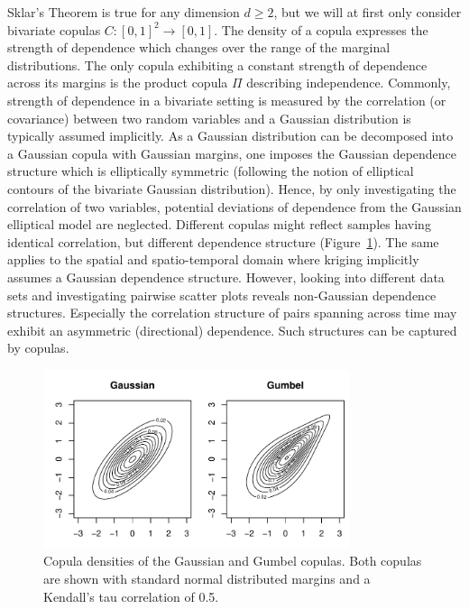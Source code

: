 \documentclass[article,nojss]{jss}
\begin{document}
Sklar's Theorem is true for any dimension $d \geq 2$, but we will at first only consider bivariate copulas $C:[0,1]^2\rightarrow[0,1]$. The density of a copula expresses the strength of dependence which changes over the range of the marginal distributions. The only copula exhibiting a constant strength of dependence across its margins is the product copula $\Pi$ describing independence. Commonly, strength of dependence in a bivariate setting is measured by the correlation (or covariance) between two random variables and a Gaussian distribution is typically assumed implicitly. As a Gaussian distribution can be decomposed into a Gaussian copula with Gaussian margins, one imposes the Gaussian dependence structure which is elliptically symmetric (following the notion of elliptical contours of the bivariate Gaussian distribution). Hence, by only investigating the correlation of two variables, potential deviations of dependence from the Gaussian elliptical model are neglected. Different copulas might reflect samples having identical correlation, but different dependence structure (Figure~\ref{fig:copula_densities}). The same applies to the spatial and spatio-temporal domain where kriging implicitly assumes a Gaussian dependence structure. However, looking into different data sets and investigating pairwise scatter plots reveals non-Gaussian dependence structures. Especially the correlation structure of pairs spanning across time may exhibit an asymmetric (directional) dependence. Such structures can be captured by copulas.


\begin{figure}
\center
\includegraphics[width=0.8\textwidth]{copula_densities.pdf}
\caption{Copula densities of the Gaussian and Gumbel copulas. Both copulas are shown with standard normal distributed margins and a Kendall's tau correlation of 0.5.}\label{fig:copula_densities}
\end{figure}
\end{document}
